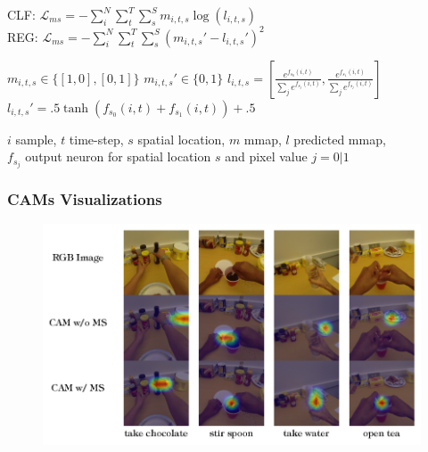 \documentclass{beamer}
\begin{document}
\begin{frame}
\begin{adjustwidth}{-1.75em}{-1.75em}
\begin{itemize}
	\begin{minipage}{.6\textwidth}
		CLF: $ {\displaystyle \mathcal{L}_{ms} = -\sum_i^N\sum_t^T\sum_s^S{m_{i,t,s} \log (l_{i,t,s}) } }$ \\
		REG: $ {\displaystyle \mathcal{L}_{ms} = -\sum_i^N\sum_t^T\sum_s^S{(m_{i,t,s}' - l_{i,t,s}')^2 } }$
	\end{minipage}%
	\begin{minipage}{.4\textwidth}
		\begin{flushright}
		${ \scriptstyle m_{i,t,s} \in \{ [1, 0], [0, 1] \} }$ 
		${ \scriptstyle m_{i,t,s}' \in \{ 0, 1 \} }$
		${ \scriptstyle l_{i,t,s} = \left [ \frac{e^{f_{s_0}(i, t)}}{\sum_j e^{f_{s_j}(i, t)}}, \frac{e^{f_{s_1}(i, t)}}{\sum_j e^{f_{s_j}(i, t)}} \right ] }$ \\
		${ \scriptstyle l_{i,t,s}' =  .5 \tanh (f_{s_0}(i, t) + f_{s_1}(i, t)) + .5 }$
		\end{flushright}
	\end{minipage}

	{\scriptsize $i$ sample, $t$ time-step, $s$ spatial location, $m$ mmap, $l$ predicted mmap, \\ \vspace*{-5pt} $f_{s_j}$ output neuron for spatial location $s$ and pixel value $j = 0|1$}

	
\end{itemize}

\end{adjustwidth}
\end{frame}

\begin{frame}
\frametitle{CAMs Visualizations}

\begin{figure}
\includegraphics[width=\textwidth]{../schemi/cams_img}
\end{figure}

\end{frame}
\end{document}
